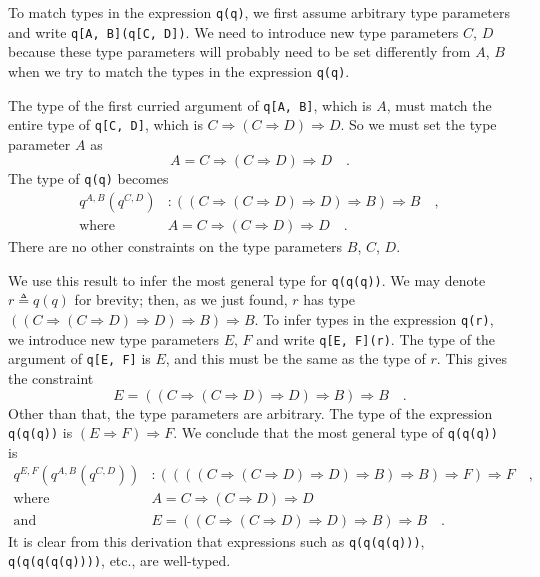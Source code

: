 To match types in the expression \lstinline!q(q)!, we first assume
arbitrary type parameters and write \lstinline!q[A, B](q[C, D])!.
We need to introduce new type parameters $C$, $D$ because these
type parameters will probably need to be set differently from $A$,
$B$ when we try to match the types in the expression \lstinline!q(q)!.

The type of the first curried argument of \lstinline!q[A, B]!, which
is $A$, must match the entire type of \lstinline!q[C, D]!, which
is $C\Rightarrow\left(C\Rightarrow D\right)\Rightarrow D$. So we
must set the type parameter $A$ as
\[
A=C\Rightarrow\left(C\Rightarrow D\right)\Rightarrow D\quad.
\]
The type of \lstinline!q(q)! becomes
\begin{align*}
q^{A,B}(q^{C,D}) & :\left(\left(C\Rightarrow\left(C\Rightarrow D\right)\Rightarrow D\right)\Rightarrow B\right)\Rightarrow B\quad,\\
\text{where}\quad & A=C\Rightarrow\left(C\Rightarrow D\right)\Rightarrow D\quad.
\end{align*}
There are no other constraints on the type parameters $B$, $C$,
$D$.

We use this result to infer the most general type for \lstinline!q(q(q))!.
We may denote $r\triangleq q(q)$ for brevity; then, as we just found,
$r$ has type $\left(\left(C\Rightarrow\left(C\Rightarrow D\right)\Rightarrow D\right)\Rightarrow B\right)\Rightarrow B$.
To infer types in the expression \lstinline!q(r)!, we introduce new
type parameters $E$, $F$ and write \lstinline!q[E, F](r)!. The
type of the argument of \lstinline!q[E, F]! is $E$, and this must
be the same as the type of $r$. This gives the constraint
\[
E=\left(\left(C\Rightarrow\left(C\Rightarrow D\right)\Rightarrow D\right)\Rightarrow B\right)\Rightarrow B\quad.
\]
Other than that, the type parameters are arbitrary. The type of the
expression \lstinline!q(q(q))! is $\left(E\Rightarrow F\right)\Rightarrow F$.
We conclude that the most general type of \lstinline!q(q(q))! is
\begin{align*}
q^{E,F}(q^{A,B}(q^{C,D})) & :\left(\left(\left(\left(C\Rightarrow\left(C\Rightarrow D\right)\Rightarrow D\right)\Rightarrow B\right)\Rightarrow B\right)\Rightarrow F\right)\Rightarrow F\quad,\\
\text{where}\quad & A=C\Rightarrow\left(C\Rightarrow D\right)\Rightarrow D\\
\text{and}\quad & E=\left(\left(C\Rightarrow\left(C\Rightarrow D\right)\Rightarrow D\right)\Rightarrow B\right)\Rightarrow B\quad.
\end{align*}
It is clear from this derivation that expressions such as \lstinline!q(q(q(q)))!,
\lstinline!q(q(q(q(q))))!, etc., are well-typed.

